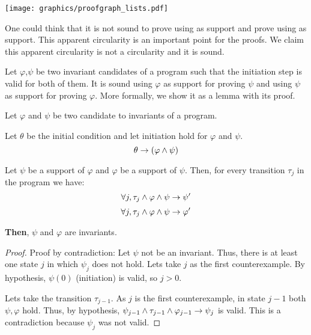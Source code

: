 \begin{center}
\texttt{[image: graphics/proofgraph\_lists.pdf]}
\label{fig:proofgraph}
\end{center}


One could think that it is not sound to prove \invLock using \invRegion as support and prove \invRegion using \invLock as support. 
%
This apparent circularity is an important point for the proofs.
%
We claim this apparent circularity is not a circularity and it is sound.

Let $\varphi$,$\psi$ be two invariant candidates of a program such that the initiation step is valid for both of them.
%
It is sound using $\varphi$ as support for proving $\psi$ and using $\psi$ as support for proving $\varphi$. More formally, we show it as a lemma with its proof.

\begin{lemma}
Let $\varphi$ and $\psi$ be two candidate to invariants of a program. 


Let $\theta$ be the initial condition and let initiation hold for $\varphi$ and $\psi$.
\[\theta \to (\varphi \wedge \psi)\]

Let $\psi$ be a support of $\varphi$ and $\varphi$ be a support of $\psi$. Then, for every transition $\tau_j$ in the program we have:
%
\[\forall j, \tau_j \wedge \varphi \wedge \psi \to \psi'\]
\[\forall j, \tau_j \wedge \varphi \wedge \psi \to \varphi'\]

\textbf{Then}, $\psi$ and $\varphi$ are invariants.
\end{lemma}

\begin{proof}
Proof by contradiction: Let $\psi$ not be an invariant.
%
Thus, there is at least one state $j$ in which $\psi_j$ does not hold.
%
Lets take $j$ as the first counterexample.
%
By hypothesis, $\psi(0)$ (initiation) is valid, so $j>0$.

Lets take the transition $\tau_{j-1}$.
%
As $j$ is the first counterexample, in state ${j-1}$ both $\psi,\varphi$ hold.
%
Thus, by hypothesis, $\psi_{j-1} \wedge \tau_{j-1} \wedge \varphi_{j-1} \to \psi_j$ is valid.
%
This is a contradiction because $\psi_j$ was not valid.
\end{proof}



